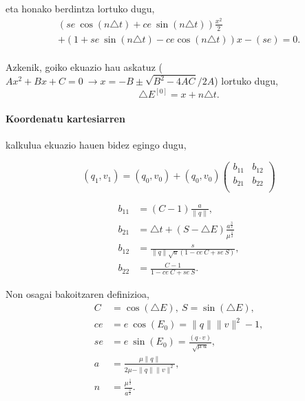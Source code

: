 eta honako berdintza lortuko dugu,
\begin{multline*}
(se \ \cos(n \triangle t)+ce \ \sin(n \triangle t)) \frac{x^2}{2} \\
+ (1+se \ \sin(n \triangle t)-ce \cos(n \triangle t))x-(se )=0.
\end{multline*}

\paragraph*{} Azkenik, goiko ekuazio hau askatuz ($Ax^2+Bx+C=0 \ \rightarrow x={-B\pm \sqrt{B^2-4AC}}/{2A}$) lortuko dugu,
\begin{equation*}
\triangle E^{[0]}=x+n\triangle t.
\end{equation*}

\paragraph*{Koordenatu kartesiarren} kalkulua ekuazio hauen bidez egingo dugu,

\begin{equation*}
(q_1,v_1)=(q_0,v_0)+ (q_0,v_0) \left(\begin{array}{cc}
                                       b_{11} & b_{12} \\
                                       b_{21} & b_{22} \\
                                \end{array}\right)
\end{equation*}

\begin{align*}
b_{11} &=(C-1) \frac{a}{\|q\|}, \\
b_{21} &=\triangle t+(S-\triangle E) \frac{a^{\frac{3}{2}}}{\mu^{\frac{1}{2}}} \\
b_{12} &=\frac{s}{\|q\| \sqrt{a} (1-ce \ C +se \ S)}, \\
b_{22} &=\frac{C-1}{1-ce \ C+ se \ S}. 
\end{align*}

Non osagai bakoitzaren definizioa,
\begin{align*}
C &=\cos(\triangle E), \ S=\sin(\triangle E), \\
ce &=e \ \cos(E_0) = \|q\| \|v\|^2-1, \\
se &= e \ \sin(E_0)=\frac{(q \cdot v)}{\sqrt{\mu \ a}}, \\
a &= \frac{\mu \|q\|}{2\mu-\|q\|\|v\|^2}, \\
n &= \frac{\mu^{\frac{1}{2}}}{a^{\frac{3}{2}}}.
\end{align*}

